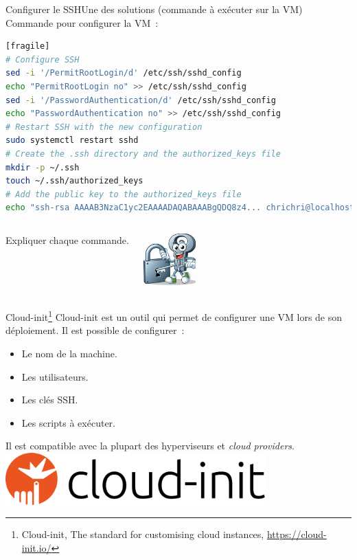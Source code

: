 \documentclass{beamer}
\begin{document}
    \begin{frame}[fragile]{Configurer le SSH}{Une des solutions (commande à exécuter sur la VM)}
        Commande pour configurer la VM~:
        \begin{lstlisting}[language=bash][fragile]
# Configure SSH
sed -i '/PermitRootLogin/d' /etc/ssh/sshd_config
echo "PermitRootLogin no" >> /etc/ssh/sshd_config
sed -i '/PasswordAuthentication/d' /etc/ssh/sshd_config
echo "PasswordAuthentication no" >> /etc/ssh/sshd_config
# Restart SSH with the new configuration
sudo systemctl restart sshd
# Create the .ssh directory and the authorized_keys file
mkdir -p ~/.ssh
touch ~/.ssh/authorized_keys
# Add the public key to the authorized_keys file
echo "ssh-rsa AAAAB3NzaC1yc2EAAAADAQABAAABgQDQ8z4... chrichri@localhost" >> ~/.ssh/authorized_keys
        \end{lstlisting}
        \begin{columns}
            Expliquer chaque commande.
            \begin{center}
                \includegraphics[width=2cm]{image/funny-key}
            \end{center}
        \end{columns}
    \end{frame}

    \begin{frame}{Cloud-init\footnote{Cloud-init, The standard for customising cloud instances, \url{https://cloud-init.io/}}}
        Cloud-init est un outil qui permet de configurer une VM lors de son déploiement.
        \bigbreak
        Il est possible de configurer~:
        \begin{itemize}
            \item Le nom de la machine.
            \item Les utilisateurs.
            \item Les clés SSH.
            \item Les scripts à exécuter.
        \end{itemize}
        Il est compatible avec la plupart des hyperviseurs et \textit{cloud providers}.
        \bigbreak
        \centering
        \includegraphics[width=10cm]{image/cloud-init}
    \end{frame}
\end{document}
